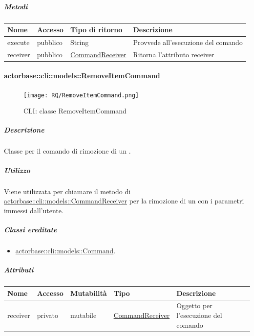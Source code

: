 \documentclass{scalatekids-article}
\begin{document}
\subparagraph{Metodi}

\begin{tabular}{| p{3cm} | p{1.5cm} | p{3.5cm} | p{9cm} |}
  \hline
  Nome & Accesso & Tipo di ritorno & Descrizione\\
  \hline
  execute & pubblico & String & Provvede all'esecuzione del comando\\
  \hline
  receiver & pubblico & \hyperref[sec:actorbase::cli::models::CommandReceiver]{CommandReceiver} & Ritorna l'attributo receiver\\
  \hline
\end{tabular}

\paragraph{actorbase::cli::models::RemoveItemCommand}
\label{sec:actorbase::cli::models::RemoveItemCommand}

\begin{figure}[H]
  \begin{center}
    \texttt{[image: RQ/RemoveItemCommand.png]}
    \caption{CLI: classe RemoveItemCommand}
  \end{center}
\end{figure}

\subparagraph{Descrizione}

Classe per il comando di rimozione di un .

\subparagraph{Utilizzo}

Viene utilizzata per chiamare il metodo di
\hyperref[sec:actorbase::cli::models::CommandReceiver]{actorbase::cli::models::CommandReceiver} per la rimozione di un 
con i parametri immessi dall'utente.

\subparagraph{Classi ereditate}

\begin{itemize}
\item \hyperref[sec:actorbase::cli::models::Command]{actorbase::cli::models::Command}.
\end{itemize}

\subparagraph{Attributi}

\begin{tabular}{| p{1cm} | p{1.5cm} | p{2cm} | p{4cm} | p{8.5cm} |}
  \hline
  Nome & Accesso & Mutabilità & Tipo & Descrizione\\
  \hline
  receiver & privato & mutabile & \hyperref[sec:actorbase::cli::models::CommandReceiver]{CommandReceiver} & Oggetto per l'esecuzione del comando\\
  \hline
\end{tabular}
\end{document}
